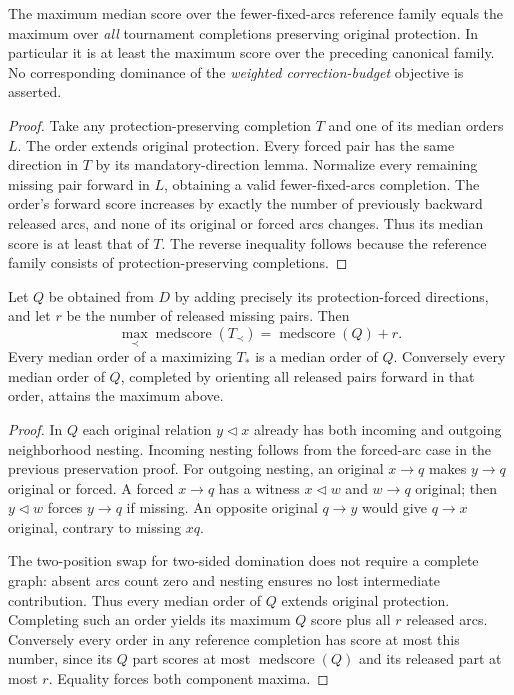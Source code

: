 \begin{lemma}
\label{lem:protection-forced-all-completion-normalization}
The maximum median score over the fewer-fixed-arcs reference family
equals the maximum over \emph{all} tournament completions preserving
original protection. In particular it is at least the maximum score
over the preceding canonical family. No corresponding dominance of
the \emph{weighted correction-budget} objective is asserted.
\end{lemma}
\begin{proof}
Take any protection-preserving completion $T$ and one of its median
orders $L$. The order extends original protection. Every forced pair
has the same direction in $T$ by its mandatory-direction lemma.
Normalize every remaining missing pair forward in $L$, obtaining a
valid fewer-fixed-arcs completion. The order's forward score increases
by exactly the number of previously backward released arcs, and none
of its original or forced arcs changes. Thus its median score is at
least that of $T$. The reverse inequality follows because the reference
family consists of protection-preserving completions.
\end{proof}

\begin{lemma}
\label{lem:protection-forced-fixed-partial-median}
Let $Q$ be obtained from $D$ by adding precisely its protection-forced
directions, and let $r$ be the number of released missing pairs. Then
\[
 \max_{\prec}\operatorname{medscore}(T_\prec)
       =\operatorname{medscore}(Q)+r.
\]
Every median order of a maximizing $T_*$ is a median order of $Q$.
Conversely every median order of $Q$, completed by orienting all
released pairs forward in that order, attains the maximum above.
\end{lemma}
\begin{proof}
In $Q$ each original relation $y\triangleleft x$ already has both
incoming and outgoing neighborhood nesting. Incoming nesting follows
from the forced-arc case in the previous preservation proof. For
outgoing nesting, an original $x\to q$ makes $y\to q$ original or
forced. A forced $x\to q$ has a witness $x\triangleleft w$ and
$w\to q$ original; then $y\triangleleft w$ forces $y\to q$ if
missing. An opposite original $q\to y$ would give $q\to x$ original,
contrary to missing $xq$.

The two-position swap for two-sided domination does not require a
complete graph: absent arcs count zero and nesting ensures no lost
intermediate contribution. Thus every median order of $Q$ extends
original protection. Completing such an order yields its maximum
$Q$ score plus all $r$ released arcs. Conversely every order in any
reference completion has score at most this number, since its $Q$
part scores at most $\operatorname{medscore}(Q)$ and its released
part at most $r$. Equality forces both component maxima.
\end{proof}

